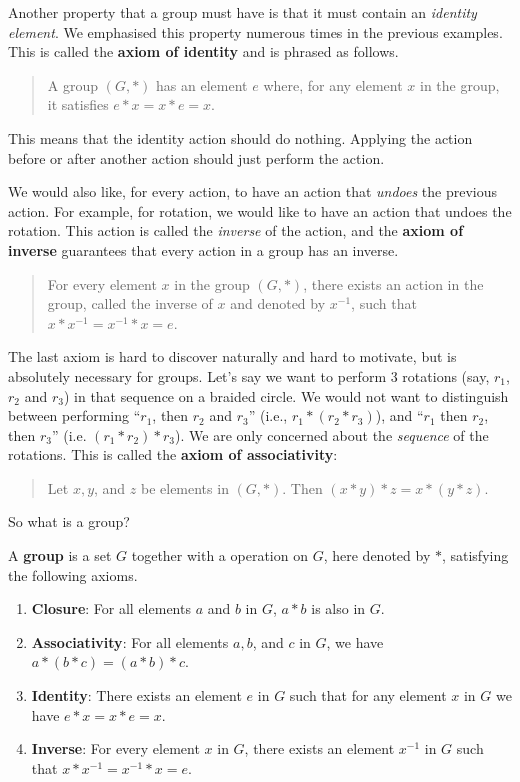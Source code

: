 Another property that a group must have is that it must contain an \textit{identity element}. We emphasised this property numerous times in the previous examples. This is called the \textbf{axiom of identity} and is phrased as follows.
\begin{quote}
    A group $(G, \ast)$ has an element $e$ where, for any element $x$ in the group, it satisfies $e \ast x = x \ast e = x$.
\end{quote}
This means that the identity action should do nothing. Applying the action before or after another action should just perform the action.

We would also like, for every action, to have an action that \textit{undoes} the previous action. For example, for rotation, we would like to have an action that undoes the rotation. This action is called the \textit{inverse} of the action, and the \textbf{axiom of inverse} guarantees that every action in a group has an inverse.

\begin{quote}
    For every element $x$ in the group $(G, \ast)$, there exists an action in the group, called the inverse of $x$ and denoted by $x^{-1}$, such that $x \ast x^{-1} = x^{-1} \ast x = e$.
\end{quote}

The last axiom is hard to discover naturally and hard to motivate, but is absolutely necessary for groups. Let's say we want to perform 3 rotations (say, $r_1$, $r_2$ and $r_3$) in that sequence on a braided circle. We would not want to distinguish between performing ``$r_1$, then $r_2$ and $r_3$'' (i.e., $r_1 \ast (r_2 \ast r_3)$), and ``$r_1$ then $r_2$, then $r_3$'' (i.e. $(r_1 \ast r_2) \ast r_3$). We are only concerned about the \textit{sequence} of the rotations. This is called the \textbf{axiom of associativity}:
\begin{quote}
    Let $x, y$, and $z$ be elements in $(G, \ast)$. Then $(x \ast y) \ast z = x \ast (y \ast z)$.
\end{quote}

\newpage

So what is a group?
\begin{definition}
    A \textbf{group} is a set $G$ together with a operation on $G$, here denoted by $\ast$, satisfying the following axioms.
    \begin{enumerate}
        \item \textbf{Closure}: For all elements $a$ and $b$ in $G$, $a \ast b$ is also in $G$.
        \item \textbf{Associativity}: For all elements $a, b$, and $c$ in $G$, we have $a \ast (b \ast c) = (a \ast b) \ast c$.
        \item \textbf{Identity}: There exists an element $e$ in $G$ such that for any element $x$ in $G$ we have $e \ast x = x \ast e = x$.
        \item \textbf{Inverse}: For every element $x$ in $G$, there exists an element $x^{-1}$ in $G$ such that $x \ast x^{-1} = x^{-1} \ast x = e$.
    \end{enumerate}
\end{definition}

